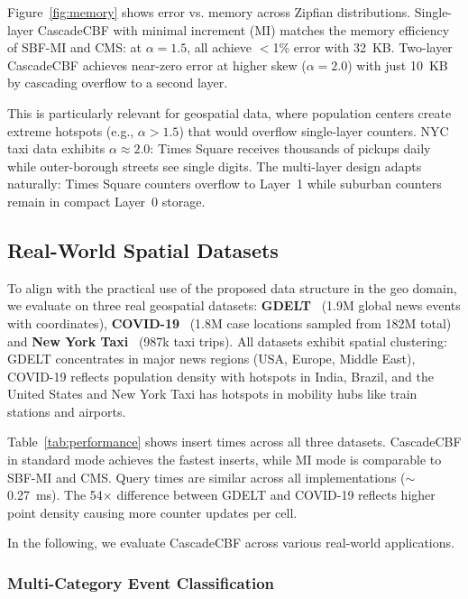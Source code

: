 \documentclass[agile, final]{copernicus-agile}
\begin{document}
Figure~\ref{fig:memory} shows error vs. memory across Zipfian distributions. Single-layer CascadeCBF with minimal increment (MI) matches the memory efficiency of SBF-MI and CMS: at $\alpha=1.5$, all achieve $<$1\% error with 32~KB. Two-layer CascadeCBF achieves near-zero error at higher skew ($\alpha=2.0$) with just 10~KB by cascading overflow to a second layer.

This is particularly relevant for geospatial data, where population centers create extreme hotspots (e.g., $\alpha > 1.5$) that would overflow single-layer counters. NYC taxi data exhibits $\alpha \approx 2.0$: Times Square receives thousands of pickups daily while outer-borough streets see single digits. The multi-layer design adapts naturally: Times Square counters overflow to Layer~1 while suburban counters remain in compact Layer~0 storage.

\subsection{Real-World Spatial Datasets}

To align with the practical use of the proposed data structure in the geo domain, we evaluate on three real geospatial datasets: \textbf{GDELT}~\citep{leetaru2013gdelt} (1.9M global news events with coordinates), \textbf{COVID-19}~\citep{dong2020interactive} (1.8M case locations sampled from 182M total) and \textbf{New York Taxi}~\citep{nyc_tlc_data} (987k taxi trips). All datasets exhibit spatial clustering: GDELT concentrates in major news regions (USA, Europe, Middle East), COVID-19 reflects population density with hotspots in India, Brazil, and the United States and New York Taxi has hotspots in mobility hubs like train stations and airports.

Table~\ref{tab:performance} shows insert times across all three datasets. CascadeCBF in standard mode achieves the fastest inserts, while MI mode is comparable to SBF-MI and CMS. Query times are similar across all implementations ($\sim$0.27~ms). The 54$\times$ difference between GDELT and COVID-19 reflects higher point density causing more counter updates per cell.



In the following, we evaluate CascadeCBF across various real-world applications.


\subsubsection{Multi-Category Event Classification}
\end{document}
